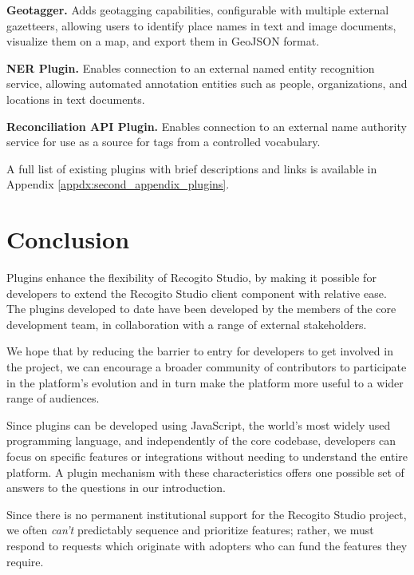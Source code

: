 \documentclass[final]{anthology-ch}         %
\begin{document}
\noindent
\textbf{Geotagger.} Adds geotagging capabilities, configurable with multiple external gazetteers, allowing users to identify place names in text and image documents, visualize them on a map, and export them in GeoJSON format.



\noindent
\textbf{NER Plugin.} Enables connection to an external named entity recognition service, allowing automated annotation entities such as people, organizations, and locations in text documents.



\noindent
\textbf{Reconciliation API Plugin.} Enables connection to an external name authority service for use as a source for tags from a controlled vocabulary.

\noindent
\newline
A full list of existing plugins with brief descriptions and links is available in Appendix \ref{appdx:second_appendix_plugins}.

\section{Conclusion}

Plugins enhance the flexibility of Recogito Studio, by making it possible for developers to extend the Recogito Studio client component with relative ease. The plugins developed to date have been developed by the members of the core development team, in collaboration with a range of external stakeholders. 

We hope that by reducing the barrier to entry for developers to get involved in the project, we can encourage a broader community of contributors to participate in the platform's evolution and in turn make the platform more useful to a wider range of audiences.

Since plugins can be developed using JavaScript, the world's most widely used programming language, and independently of the core codebase, developers can focus on specific features or integrations without needing to understand the entire platform.  A plugin mechanism with these characteristics offers one possible set of answers to the questions in our introduction.
  
  Since there is no permanent institutional support for the Recogito Studio project, we often \textit{can't} predictably sequence and prioritize features; rather, we must respond to requests which originate with adopters who can fund the features they require. 
  
\end{document}
